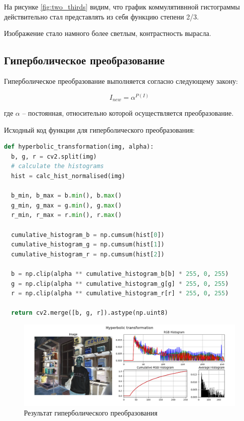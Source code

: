 На рисунке \ref{fig:two_thirds} видим, что график коммулятивнной гистограммы действительно стал представлять из себя функцию степени 2/3. 

Изображение стало намного более светлым, контрастность вырасла. 

\subsection{Гиперболическое преобразование}  

Гиперболическое преобразование выполняется согласно следующему закону:

\begin{equation}
  I_{new} = \alpha^{P(I)}
\end{equation}

где $\alpha$ -- постоянная, относительно которой осуществляется преобразование.

Исходный код функции для гиперболического преобразования:

\begin{lstlisting}[language=Python]
def hyperbolic_transformation(img, alpha):
  b, g, r = cv2.split(img)
  # calculate the histograms
  hist = calc_hist_normalised(img)

  b_min, b_max = b.min(), b.max()
  g_min, g_max = g.min(), g.max()
  r_min, r_max = r.min(), r.max()

  cumulative_histogram_b = np.cumsum(hist[0]) 
  cumulative_histogram_g = np.cumsum(hist[1])
  cumulative_histogram_r = np.cumsum(hist[2])

  b = np.clip(alpha ** cumulative_histogram_b[b] * 255, 0, 255)
  g = np.clip(alpha ** cumulative_histogram_g[g] * 255, 0, 255)
  r = np.clip(alpha ** cumulative_histogram_r[r] * 255, 0, 255)
  
  return cv2.merge([b, g, r]).astype(np.uint8)
\end{lstlisting}

\begin{figure}[H]
    \centering
    \includegraphics[width=\textwidth]{../results/Hyperbolic transformation.png}
    \caption{Результат гиперболического преобразования}
    \label{fig:hyperbolic}
\end{figure}

